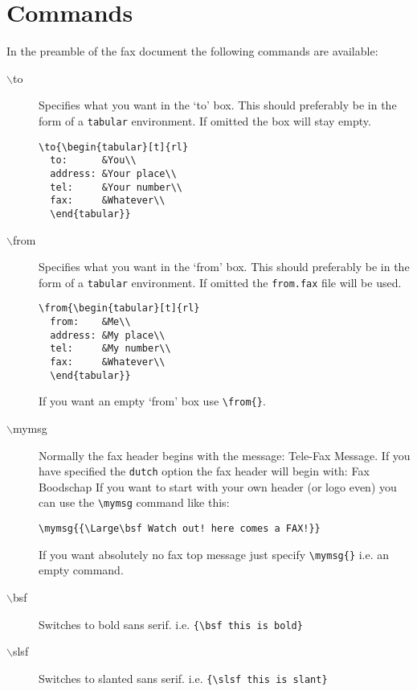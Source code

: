 \documentclass[oldtoc,a4paper,10pt]{artikel3}
\begin{document}
\section{Commands}
In the preamble of the fax document the following commands are available:
\begin{description}
\item[$\backslash$to] Specifies what you want in the `to' box. This should
  preferably be in the form of a {\tt tabular} environment. If omitted the
  box will stay empty.
\begin{verbatim}
\to{\begin{tabular}[t]{rl}
  to:      &You\\
  address: &Your place\\
  tel:     &Your number\\
  fax:     &Whatever\\
  \end{tabular}}
\end{verbatim}
\item[$\backslash$from] Specifies what you want in the `from' box. This should
  preferably be in the form of a {\tt tabular} environment. If omitted the
  {\tt from.fax} file will be used.
\begin{verbatim}
\from{\begin{tabular}[t]{rl}
  from:    &Me\\
  address: &My place\\
  tel:     &My number\\
  fax:     &Whatever\\
  \end{tabular}}
\end{verbatim}
  If you want an empty `from' box use \verb|\from{}|.
\item[$\backslash$mymsg] Normally the fax header begins with the message:
  {\sc Tele-Fax Message}. If you have specified the {\tt dutch} option the
  fax header will begin with: {\sc Fax Boodschap} If you want to start with
  your own header (or logo even) you can use the \verb|\mymsg| command like
  this:
  \begin{center}
  \vspace{1.5ex}
  \verb|\mymsg{{\Large\bsf Watch out! here comes a FAX!}}|
  \vspace{1.5ex}
  \end{center}
  If you want absolutely no fax top message just specify \verb|\mymsg{}|
  i.e. an empty command.
\item[$\backslash$bsf] Switches to bold sans serif. i.e. \verb|{\bsf this is bold}|
\item[$\backslash$slsf] Switches to slanted sans serif. i.e. \verb|{\slsf this is slant}|
\end{description}
\end{document}
